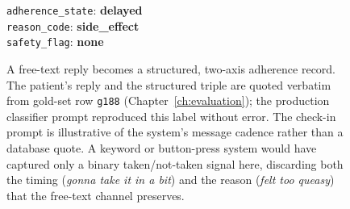 \begin{figure}[htbp]
  \centering
  \begin{minipage}[t]{0.58\textwidth}
    \vspace{0pt}
    \begin{smsthread}
    \end{smsthread}
  \end{minipage}%
  \hfill
  \begin{minipage}[t]{0.36\textwidth}
    \vspace{18pt}
    \begin{tcolorbox}[smsrecordbox, title=Structured record]
      \texttt{adherence\_state}: \textbf{delayed}\\[2pt]
      \texttt{reason\_code}: \textbf{side\_effect}\\[2pt]
      \texttt{safety\_flag}: \textbf{none}
    \end{tcolorbox}
  \end{minipage}
  \caption{A free-text reply becomes a structured, two-axis adherence record.
  The patient's reply and the structured triple are quoted verbatim from
  gold-set row \texttt{g188} (Chapter~\ref{ch:evaluation}); the
  production classifier prompt reproduced this label without error. The
  check-in prompt is illustrative of the system's message cadence rather than
  a database quote. A keyword or button-press system would have captured only
  a binary taken/not-taken signal here, discarding both the timing (\emph{gonna
  take it in a bit}) and the reason (\emph{felt too queasy}) that the free-text
  channel preserves.}
  \label{fig:sms-hero}
\end{figure}
